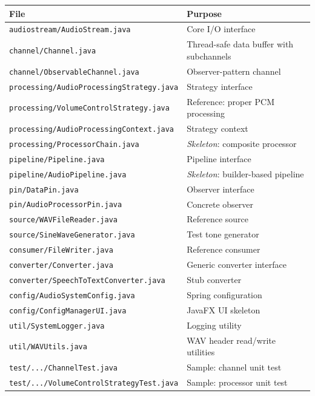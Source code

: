 \documentclass[a4paper,12pt]{article}
\begin{document}
\begin{center}
\small
\begin{tabular}{|l|l|}
\hline
\textbf{File} & \textbf{Purpose} \\
\hline
\texttt{audiostream/AudioStream.java} & Core I/O interface \\
\texttt{channel/Channel.java} & Thread-safe data buffer with subchannels \\
\texttt{channel/ObservableChannel.java} & Observer-pattern channel \\
\texttt{processing/AudioProcessingStrategy.java} & Strategy interface \\
\texttt{processing/VolumeControlStrategy.java} & Reference: proper PCM processing \\
\texttt{processing/AudioProcessingContext.java} & Strategy context \\
\texttt{processing/ProcessorChain.java} & \textit{Skeleton}: composite processor \\
\texttt{pipeline/Pipeline.java} & Pipeline interface \\
\texttt{pipeline/AudioPipeline.java} & \textit{Skeleton}: builder-based pipeline \\
\texttt{pin/DataPin.java} & Observer interface \\
\texttt{pin/AudioProcessorPin.java} & Concrete observer \\
\texttt{source/WAVFileReader.java} & Reference source \\
\texttt{source/SineWaveGenerator.java} & Test tone generator \\
\texttt{consumer/FileWriter.java} & Reference consumer \\
\texttt{converter/Converter.java} & Generic converter interface \\
\texttt{converter/SpeechToTextConverter.java} & Stub converter \\
\texttt{config/AudioSystemConfig.java} & Spring configuration \\
\texttt{config/ConfigManagerUI.java} & JavaFX UI skeleton \\
\texttt{util/SystemLogger.java} & Logging utility \\
\texttt{util/WAVUtils.java} & WAV header read/write utilities \\
\hline
\texttt{test/.../ChannelTest.java} & Sample: channel unit test \\
\texttt{test/.../VolumeControlStrategyTest.java} & Sample: processor unit test \\
\hline
\end{tabular}
\end{center}
\end{document}
